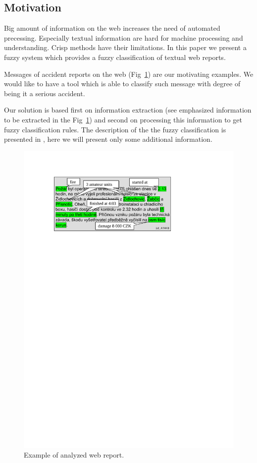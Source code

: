 \begin{multicols}{2}
\subsection{Motivation}
Big amount of information on the web increases the need of automated precessing. Especially textual information are hard for machine processing and understanding. Crisp methods have their limitations. In this paper we present a fuzzy system which provides a fuzzy classification of textual web reports. 

Messages of accident reports on the web (Fig~\ref{dedek:message}) are our motivating examples. We would like to have a tool which is able to classify such message with degree of being it a serious accident. 

Our solution is based first on information extraction (see emphasized information to be extracted in the Fig~\ref{dedek:message}) and second on processing this information to get fuzzy classification rules. The description of the the fuzzy classification is presented in \cite{Dedek:FuzzWI}, here we will present only some additional information.

\begin{figure}
\medskip
\centerline{\includegraphics[width=\hsize]{img/message}}
\caption{Example of analyzed web report.}
\label{dedek:message}
\end{figure}



\end{multicols}
